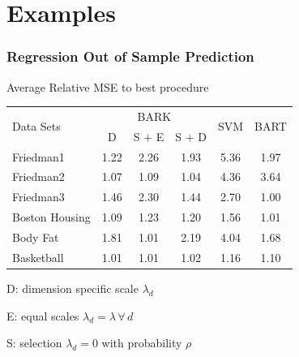 \documentclass[]{beamer}\usepackage[]{graphicx}\usepackage[]{color}
\newcommand{\bs}[2]{\begin{frame} \frametitle{#1}
{#2}
\end{frame} }
\begin{document}
\section{Examples}

\bs{Regression Out of Sample Prediction} {
Average Relative MSE to best procedure
\small{
  \begin{tabular}[ht]{|l|c|c|c|c|c|}
    \hline
  \multirow{2}{*}{Data Sets} &
  \multicolumn{3}{c|}{BARK} &
  \multirow{2}{*}{SVM}&
  \multirow{2}{*}{BART} \\
  \cline{2-4}
  &  D
  & S $+$ E & S $+$ D && \\
    \hline
  Friedman1       %
  & 1.22 & 2.26 & 1.93 & 5.36 & 1.97 \\
  Friedman2       %
  & 1.07 & 1.09 & 1.04 & 4.36 & 3.64 \\
  Friedman3       %
  & 1.46 & 2.30 & 1.44 & 2.70 & 1.00 \\
  Boston Housing  %
  & 1.09 & 1.23 & 1.20 & 1.56 & 1.01 \\
  Body Fat        %
  & 1.81 & 1.01 & 2.19 & 4.04 & 1.68 \\
  Basketball      %
  & 1.01 & 1.01 & 1.02 & 1.16 & 1.10 \\\hline
  \end{tabular}
}

D: dimension specific scale $\lambda_d$

E: equal scales $\lambda_d = \lambda \, \forall \, d$

S: selection $\lambda_d = 0$ with probability $\rho$

}

\end{document}
